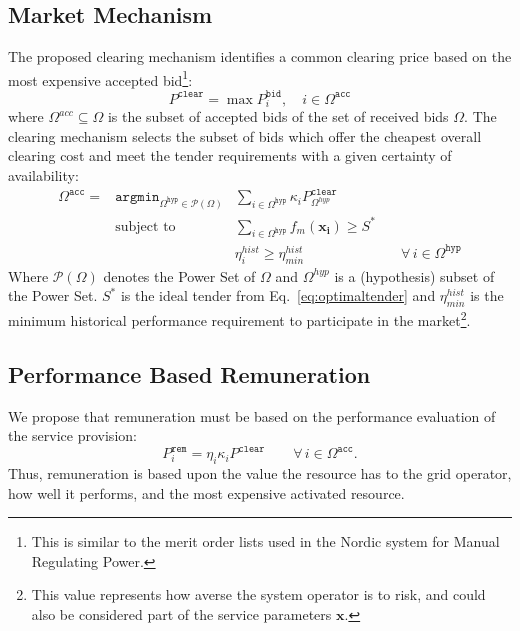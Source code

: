 \subsection*{Market Mechanism}
The proposed clearing mechanism identifies a common clearing price based on the most expensive accepted bid\footnote{This is similar to the merit order lists used in \eg the Nordic system for Manual Regulating Power\cite{bondy2013}.}:
\begin{equation}
    P^\mathtt{clear} = \max P^\mathtt{bid}_i, \quad i \in \Omega^\mathtt{acc}
\end{equation}
where $\Omega^{acc}\subseteq \Omega$ is the subset of accepted bids of the set of received bids $\Omega$. 
The clearing mechanism selects the subset of bids which offer the cheapest overall clearing cost and meet the tender requirements with a given certainty of availability: 
\begin{align}
	\Omega^\mathtt{acc} = &\mathtt{argmin}_{\Omega^\mathtt{hyp} \in \mathcal P(\Omega)} &\sum_{i\in \Omega^\mathtt{hyp}}{\kappa_i P^\mathtt{clear}_{\Omega^{hyp}} }  \\
	  &\text{subject to} &\sum_{i\in \Omega^\mathtt{hyp}} f_m(\mathbf{x_i}) \geq S^*   \\
      &~  &\eta^{hist}_i \geq \eta^{hist}_{min} &\quad \forall \, i \in \Omega^\mathtt{hyp} 
\end{align}
Where $\mathcal P(\Omega)$ denotes the Power Set of $\Omega$ and $\Omega^{hyp}$ is a (hypothesis) subset of the Power Set. $S^*$ is the ideal tender from Eq.~\eqref{eq:optimaltender} and $\eta^{hist}_{min}$ is the minimum historical performance requirement to participate in the market\footnote{This value represents how averse the system operator is to risk, and could also be considered part of the service parameters $\textbf{x}$.}.

\subsection*{Performance Based Remuneration}
We propose that remuneration must be based on the performance evaluation of the service provision:
\begin{equation}
	P^\mathtt{rem}_i = \eta_i\kappa_i  P^\mathtt{clear} \qquad \forall \, i \in \Omega^\mathtt{acc}.\label{eq:MAINperfrem}
\end{equation}
Thus, remuneration is based upon the value the resource has to the grid operator, how well it performs, and the most expensive activated resource.

